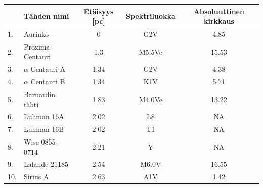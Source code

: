 \documentclass[12pt,a4paper,twoside]{article}
\begin{document}
\begin{center}
	\begin{tabular}{l | l c c c}
			&	Tähden nimi & Etäisyys [pc] & Spektriluokka & Absoluuttinen kirkkaus \\
			\hline
		1. & Aurinko & 	0 & G2V & 4.85 \\
		2. & Proxima Centauri & 1.3 & M5.5Ve & 15.53 \\
		3. & $\alpha$ Centauri A & 1.34 & G2V & 4.38 \\
		4. & $\alpha$ Centauri B & 1.34 & K1V & 5.71 \\
		5. & Barnardin tähti & 1.83 & M4.0Ve & 13.22 \\
		6. & Luhman 16A & 2.02 & L8 & NA \\
		7. & Luhman 16B & 2.02 & T1 & NA \\
		8. & Wise 0855-0714 & 2.21 & Y & NA \\
		9. & Lalande 21185 & 2.54 & M6.0V & 16.55 \\
		10. & Sirius A & 2.63 & A1V & 1.42 						
	\end{tabular}					
\end{center}
\end{document}
